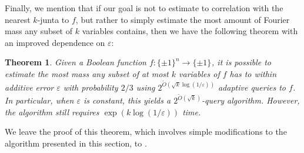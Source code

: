 \documentclass[10pt,a4paper]{article}
\theoremstyle{plain}
\newtheorem{theorem}{Theorem}[section]
\theoremstyle{remark}
\theoremstyle{plain}
\newcommand{\eps}{\varepsilon}
\renewcommand{\tilde}{\widetilde}
\newcommand{\BooleanHypercube}[1]{\{\pm 1\}^{#1}}
\renewcommand{\epsilon}{\varepsilon}
\begin{document}
Finally, we mention that if our goal is not to estimate to correlation with the nearest $k$-junta to $f$, but rather to simply estimate the most amount of Fourier mass any subset of $k$ variables contains, then we have the following theorem with an improved dependence on $\eps$:
\begin{theorem}
\label{theorem:main-result-mass}
Given a Boolean function $f: \BooleanHypercube{n} \to \BooleanHypercube{}$, it is possible to estimate the most mass any subset of at most $k$ variables of $f$ has to within additive error $\eps$ with probability $2/3$ using 
$ 2^{\tilde{O}(\sqrt{k}\log(1/\eps))}$ adaptive queries to $f$. In particular, when $\epsilon$ is constant, this yields a $2^{\tilde{O}(\sqrt{k})}$-query algorithm. However, the algorithm still requires $\exp(k\log(1/\eps))$ time.
\end{theorem}

We leave the proof of this theorem, which involves simple modifications to the algorithm presented in this section, to .
 
\end{document}
